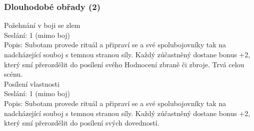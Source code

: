 \subsubsection{Dlouhodobé obřady (2)}


Požehnání v boji se zlem\\
Seslání: 1 (mimo boj)\\
Popis: Subotam provede rituál a připraví se a své spolubojovníky tak na nadcházející souboj s temnou stranou síly.  Každý zúčastněný dostane bonus +2, který smí přerozdělit do posílení svého Hodnocení zbraně či zbroje. Trvá celou scénu. \\


Posílení vlastnosti\\
Seslání: 1 (mimo boj)\\
Popis: Subotam provede rituál a připraví se a své spolubojovníky tak na nadcházející souboj s temnou stranou síly. Každý zúčastněný dostane bonus +2, který smí přerozdělit do posílení svých dovedností. \\







